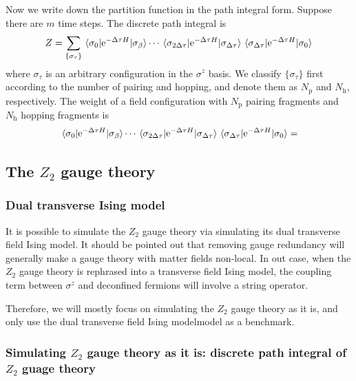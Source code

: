 \documentclass[hyperref, a4paper]{article}
\newcommand*{\ee}{\mathrm{e}}
\newcommand*{\Ztwo}{\texorpdfstring{$\mathbb{Z}_2$ }{Z2 }}
\newcommand*{\tfim}{transverse field Ising model}
\def\mathbb#1{#1}%
\begin{document}
Now we write down the partition function in the path integral form.
Suppose there are $m$ time steps. The discrete path integral is 
\begin{equation}
    Z = \sum_{\{\sigma_\tau\}} \mel{\sigma_0}{\ee^{-\Delta \tau H}}{\sigma_\beta} \cdots \mel{\sigma_{2\Delta \tau}}{\ee^{-\Delta \tau H}}{\sigma_{\Delta \tau}} \mel{\sigma_{\Delta \tau}}{\ee^{-\Delta \tau H}}{\sigma_{0}}  
\end{equation}
where $\sigma_\tau$ is an arbitrary configuration in the $\sigma^z$ basis.
We classify $\{\sigma_\tau\}$ first according to the number of pairing and hopping, and denote them as $N_\text{p}$ and $N_\text{h}$, respectively.
The weight of a field configuration with $N_\text{p}$ pairing fragments and $N_\text{h}$ hopping fragments is
\[
    \mel{\sigma_0}{\ee^{-\Delta \tau H}}{\sigma_\beta} \cdots \mel{\sigma_{2\Delta \tau}}{\ee^{-\Delta \tau H}}{\sigma_{\Delta \tau}} \mel{\sigma_{\Delta \tau}}{\ee^{-\Delta \tau H}}{\sigma_{0}} = 
\]

\subsection{The \Ztwo gauge theory}

\subsubsection{Dual transverse Ising model}

It is possible to simulate the \Ztwo gauge theory via simulating its dual \tfim.
It should be pointed out that removing gauge redundancy will generally make a gauge theory with matter fields non-local.
In out case, when the \Ztwo gauge theory is rephrased into a \tfim, the coupling term between $\sigma^z$ and deconfined fermions will involve a string operator.

Therefore, we will mostly focus on simulating the \Ztwo gauge theory as it is, and only use the dual \tfim model as a benchmark.

\subsubsection{Simulating \Ztwo gauge theory as it is: discrete path integral of \Ztwo guage theory}
\end{document}
